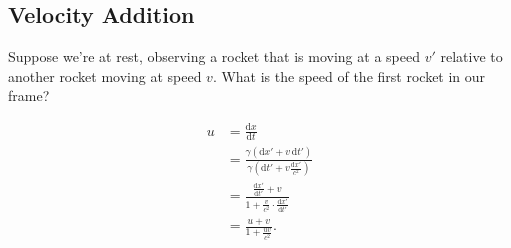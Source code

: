 \documentclass[class=article, crop=false]{standalone}
\begin{document}
  \subsection{Velocity Addition}
  Suppose we're at rest, observing a rocket that is moving at a speed $v'$ relative to another rocket moving at speed $v$. What is the speed of the first rocket in our frame? \par
  \begin{align*}
    u &= \frac{\mathrm{d}x}{\mathrm{d}t} \\
      &= \frac{\gamma (\mathrm{d}x' + v\,\mathrm{d}t')}{\gamma(\mathrm{d}t' + v \frac{\mathrm{d}x'}{c^2})} \\
      &= \frac{\frac{\mathrm{d}x'}{\mathrm{d}t'} + v}{1 + \frac{v}{c^2}\cdot \frac{\mathrm{d}x'}{\mathrm{d}t'}} \\
      &= \frac{u + v}{1 + \frac{uv}{c^2}}.
  \end{align*}
\end{document}
